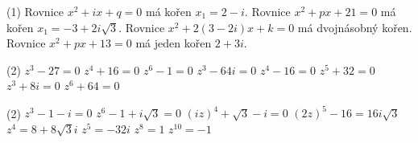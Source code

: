 \documentclass[12pt,a4paper]{article}
\begin{document}
\begin{exercise}
        \begin{tasks}(1)
            \task Rovnice $x^2+ix+q=0$ má kořen $x_1=2-i$.
            \task Rovnice $x^2+px+21=0$ má kořen $x_1=-3+2i\sqrt3$.
            \task Rovnice $x^2+2(3-2i)x+k=0$ má dvojnásobný kořen.
            \task Rovnice $x^2+px+13=0$ má jeden kořen $2+3i$.
        \end{tasks}
\end{exercise}


\begin{exercise}
    \begin{tasks}(2)
        \task $z^3-27=0$
        \task $z^4+16=0$
        \task $z^6-1=0$
        \task $z^3-64i=0$
        \task $z^4-16=0$
        \task $z^5+32=0$
        \task $z^3+8i=0$
        \task $z^6+64=0$
    \end{tasks}
\end{exercise}


\begin{exercise}
    \begin{tasks}(2)
        \task $z^3-1-i=0$
        \task $z^6-1+i\sqrt3=0$
        \task $(iz)^4+\sqrt3-i=0$
        \task $(2z)^5-16=16i\sqrt3$
        \task $z^4=8+8\sqrt3 i$
        \task $z^5=-32i$
        \task $z^8=1$
        \task $z^{10}=-1$
    \end{tasks}
\end{exercise}





\setcounter{section}{5}
\end{document}
